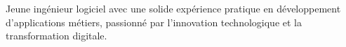 %
%
%

\par{
	Jeune ingénieur logiciel avec une solide expérience pratique en développement d'applications métiers, passionné par l'innovation technologique et la transformation digitale.
}
